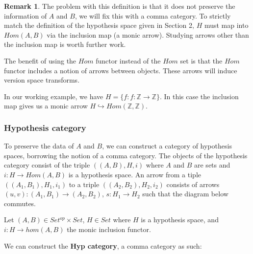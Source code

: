 \documentclass{article}
\theoremstyle{definition}
\newtheorem*{remark}{Remark}
\begin{document}
\begin{remark}
The problem with this definition is that it does not preserve the information of $A$ and $B$, we will fix this with a comma category. To strictly match the definition of the hypothesis space given in Section 2, $H$ must map into $Hom(A,B)$ via the inclusion map (a monic arrow). Studying arrows other than the inclusion map is worth further work.
\end{remark}  

The benefit of using the $Hom$ functor instead of the $Hom$ set is that the $Hom$ functor includes a notion of arrows between objects. These arrows will induce version space transforms. 

In our working example, we have $H=\{f: f: \mathbb{Z} \rightarrow \mathbb{Z}\}$. In this case the inclusion map gives us a monic arrow $H \hookrightarrow Hom(\mathbb{Z}, \mathbb{Z})$.  

\subsubsection{Hypothesis category}
To preserve the data of $A$ and $B$, we can construct a category of hypothesis spaces, borrowing the notion of a comma category. The objects of the hypothesis category consist of the triple $((A,B),H,i)$ where $A$ and $B$ are sets and $i:H \rightarrow Hom(A,B)$ is a hypothesis space. An arrow from a tiple $((A_1,B_1),H_1,i_1)$ to a triple $((A_2,B_2), H_2, i_2)$ consists of arrows $(u,v):(A_1,B_1) \rightarrow (A_2,B_2)$, $s:H_1 \rightarrow H_2$ such that the diagram below commutes. 

Let $(A, B) \in Set^{op} \times Set$, $H \in Set$ where $H$ is a hypothesis space, and $i:H \rightarrow hom(A,B)$ the monic inclusion functor. 

We can construct the \textbf{Hyp category}, a comma category as such: 
\end{document}
